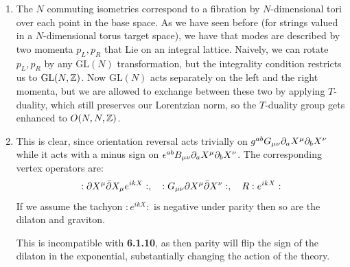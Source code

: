 \documentclass[11pt, class=article, crop=false]{standalone}
\begin{document}
\begin{enumerate}
	\item The $N$ commuting isometries correspond to a fibration by $N$-dimensional tori over each point in the base space. As we have seen before (for strings valued in a $N$-dimensional torus target space), we have that modes are described by two momenta $p_L, p_R$ that Lie on an integral lattice. Naively, we can rotate $p_L, p_R$ by any $\mathrm{GL}(N)$ transformation, but the integrality condition restricts us to $\mathrm{GL}(N, \mathbb{Z})$. Now $\mathrm{GL}(N)$ acts separately on the left and the right momenta, but we are allowed to exchange between these two by applying $T$-duality, which still preserves our Lorentzian norm, so the $T$-duality group gets enhanced to $O(N, N, \mathbb{Z})$.
	
	\item This is clear, since orientation reversal acts trivially on $g^{ab} G_{\mu \nu} \partial_a X^\mu \partial_b X^\nu$ while it acts with a minus sign on $\epsilon^{ab} B_{\mu \nu} \partial_a X^\mu \partial_b X^\nu$. The corresponding vertex operators are:
	\[
		:\partial X^\mu \bar {\partial} X_\mu e^{i k X}:, \quad   :G_{\mu \nu} \partial X^{\mu} \bar {\partial} X^\nu:, \quad R :e^{i k X}:
	\]
	If we assume the tachyon $:e^{i k X}:$ is negative under parity then so are the dilaton and graviton. 
	
	This is incompatible with \textbf{6.1.10}, as then parity will flip the sign of the dilaton in the exponential, substantially changing the action of the theory. 
	
\end{enumerate}

\end{document}

